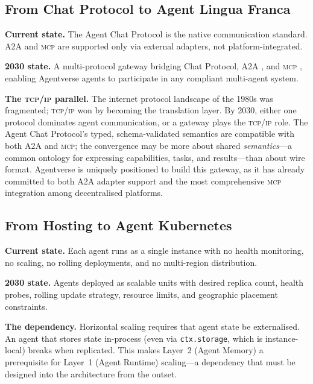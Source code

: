\documentclass[twoside,11pt]{article}
\begin{document}
\subsection{From Chat Protocol to Agent Lingua Franca}
\label{subsec:path-protocol}

\textbf{Current state.} The Agent Chat Protocol is the native communication
standard.  A2A and \textsc{mcp} are supported only via external adapters, not
platform-integrated.

\textbf{2030 state.} A multi-protocol gateway bridging Chat Protocol, A2A
\citep{a2a2026}, and \textsc{mcp} \citep{mcp2025spec}, enabling Agentverse
agents to participate in any compliant multi-agent system.

\textbf{The \textsc{tcp/ip} parallel.} The internet protocol landscape of the
1980s was fragmented; \textsc{tcp/ip} won by becoming the translation layer.
By 2030, either one protocol dominates agent communication, or a gateway plays
the \textsc{tcp/ip} role.  The Agent Chat Protocol's typed, schema-validated
semantics are compatible with both A2A and \textsc{mcp}; the convergence may
be more about shared \emph{semantics}---a common ontology for expressing
capabilities, tasks, and results---than about wire format.  Agentverse is
uniquely positioned to build this gateway, as it has already committed to both
A2A adapter support and the most comprehensive \textsc{mcp} integration among
decentralised platforms.

\subsection{From Hosting to Agent Kubernetes}
\label{subsec:path-orchestration}

\textbf{Current state.} Each agent runs as a single instance with no health
monitoring, no scaling, no rolling deployments, and no multi-region distribution.

\textbf{2030 state.} Agents deployed as scalable units with desired replica
count, health probes, rolling update strategy, resource limits, and geographic
placement constraints.

\textbf{The dependency.} Horizontal scaling requires that agent state be
externalised.  An agent that stores state in-process (even via
\texttt{ctx.storage}, which is instance-local) breaks when replicated.  This
makes Layer~2 (Agent Memory) a prerequisite for Layer~1 (Agent Runtime)
scaling---a dependency that must be designed into the architecture from the
outset.
\end{document}
